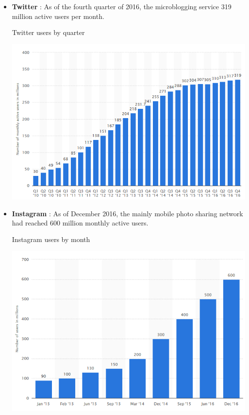 \documentclass{article}
\begin{document}
\begin{itemize}
\item \textbf{Twitter} : As of the fourth quarter of 2016, the microblogging service 319 million active users per month.\cite{key28}
\begin{table}[H]
\centering
\caption{Twitter users by quarter}
\begin{center}
\includegraphics[scale=0.5]{../R/photos/twitter_q_users.png}   
\end{center}
\end{table}
\item \textbf{Instagram} : As of December 2016, the mainly mobile photo sharing network had reached 600 million monthly active users.\cite{key29}
\begin{table}[H]
\centering
\caption{Instagram users by month}
\begin{center}
\includegraphics[scale=0.5]{../R/photos/instagram_q_users.png}   

\end{center}
\end{table}
\end{itemize}
\end{document}
